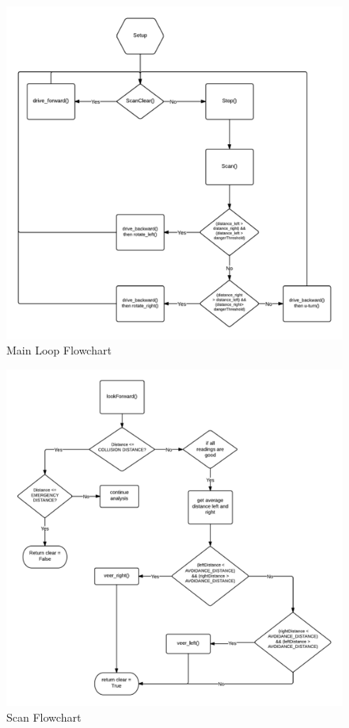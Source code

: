 \documentclass[11pt]{article}
\begin{document}
	\begin{figure}[h]\centering
	\includegraphics[height=0.85\textwidth]{images/main.png}
	\caption{Main Loop Flowchart}
		\label{main}
	\end{figure}


	\begin{figure}[h]\centering
	\includegraphics[height=0.85\textwidth]{images/scan_clear.png}
	\caption{Scan Flowchart}
		\label{scan}
	\end{figure}
\end{document}
